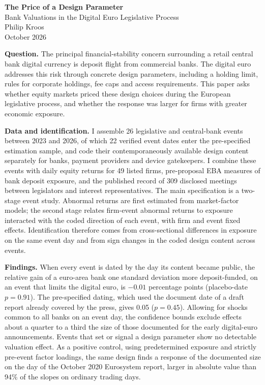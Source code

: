 \documentclass[11pt]{article}
\begin{document}
\begin{center}
{\LARGE\bfseries The Price of a Design Parameter}\\[4pt]
{\large Bank Valuations in the Digital Euro Legislative Process}\\[12pt]
{\large Philip Kroos}\\[6pt]
October 2026
\end{center}
\vspace{6pt}

\textbf{Question.} The principal financial-stability concern surrounding a retail central bank digital currency is deposit flight from commercial banks. The digital euro addresses this risk through concrete design parameters, including a holding limit, rules for corporate holdings, fee caps and access requirements. This paper asks whether equity markets priced these design choices during the European legislative process, and whether the response was larger for firms with greater economic exposure.

\textbf{Data and identification.} I assemble 26 legislative and central-bank events between 2023 and 2026, of which 22 verified event dates enter the pre-specified estimation sample, and code their contemporaneously available design content separately for banks, payment providers and device gatekeepers. I combine these events with daily equity returns for 49 listed firms, pre-proposal EBA measures of bank deposit exposure, and the published record of 309 disclosed meetings between legislators and interest representatives. The main specification is a two-stage event study. Abnormal returns are first estimated from market-factor models; the second stage relates firm-event abnormal returns to exposure interacted with the coded direction of each event, with firm and event fixed effects. Identification therefore comes from cross-sectional differences in exposure on the same event day and from sign changes in the coded design content across events.

\textbf{Findings.} When every event is dated by the day its content became public, the relative gain of a euro-area bank one standard deviation more deposit-funded, on an event that limits the digital euro, is $-0.01$ percentage points (placebo-date $p = 0.91$). The pre-specified dating, which used the document date of a draft report already covered by the press, gives 0.05 ($p = 0.45$). Allowing for shocks common to all banks on an event day, the confidence bounds exclude effects about a quarter to a third the size of those documented for the early digital-euro announcements. Events that set or signal a design parameter show no detectable valuation effect. As a positive control, using predetermined exposure and strictly pre-event factor loadings, the same design finds a response of the documented size on the day of the October 2020 Eurosystem report, larger in absolute value than 94\% of the slopes on ordinary trading days.
\end{document}
